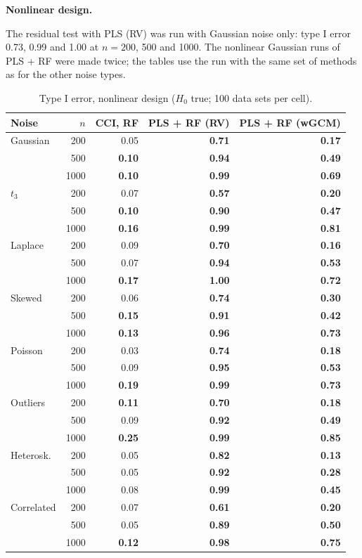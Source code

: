 \documentclass[10pt,leqno]{amsart}
\newcommand{\hi}[1]{\textbf{#1}}            %
\begin{document}
\par\medskip\noindent\textbf{Nonlinear design.}\par\nopagebreak

The residual test with PLS (RV) was run with Gaussian noise only: type I error 0.73,
0.99 and 1.00 at $n=200$, 500 and 1000. The nonlinear Gaussian runs of PLS + RF were
made twice; the tables use the run with the same set of methods as for the other noise
types.

\begin{table}[H]
\caption{Type I error, nonlinear design ($H_0$ true; 100 data sets per cell).}
\label{tab:nonlin-type1}
\footnotesize
\begin{tabular}{lrrrr}
\toprule
Noise & $n$ & CCI, RF & PLS + RF (RV) & PLS + RF (wGCM) \\
\midrule
Gaussian & 200 & 0.05 & \hi{0.71} & \hi{0.17} \\
 & 500 & \hi{0.10} & \hi{0.94} & \hi{0.49} \\
 & 1000 & \hi{0.10} & \hi{0.99} & \hi{0.69} \\
\addlinespace[1pt]
$t_3$ & 200 & 0.07 & \hi{0.57} & \hi{0.20} \\
 & 500 & \hi{0.10} & \hi{0.90} & \hi{0.47} \\
 & 1000 & \hi{0.16} & \hi{0.99} & \hi{0.81} \\
\addlinespace[1pt]
Laplace & 200 & 0.09 & \hi{0.70} & \hi{0.16} \\
 & 500 & 0.07 & \hi{0.94} & \hi{0.53} \\
 & 1000 & \hi{0.17} & \hi{1.00} & \hi{0.72} \\
\addlinespace[1pt]
Skewed & 200 & 0.06 & \hi{0.74} & \hi{0.30} \\
 & 500 & \hi{0.15} & \hi{0.91} & \hi{0.42} \\
 & 1000 & \hi{0.13} & \hi{0.96} & \hi{0.73} \\
\addlinespace[1pt]
Poisson & 200 & 0.03 & \hi{0.74} & \hi{0.18} \\
 & 500 & 0.09 & \hi{0.95} & \hi{0.53} \\
 & 1000 & \hi{0.19} & \hi{0.99} & \hi{0.73} \\
\addlinespace[1pt]
Outliers & 200 & \hi{0.11} & \hi{0.70} & \hi{0.18} \\
 & 500 & 0.09 & \hi{0.92} & \hi{0.49} \\
 & 1000 & \hi{0.25} & \hi{0.99} & \hi{0.85} \\
\addlinespace[1pt]
Heterosk. & 200 & 0.05 & \hi{0.82} & \hi{0.13} \\
 & 500 & 0.05 & \hi{0.92} & \hi{0.28} \\
 & 1000 & 0.08 & \hi{0.99} & \hi{0.45} \\
\addlinespace[1pt]
Correlated & 200 & 0.07 & \hi{0.61} & \hi{0.20} \\
 & 500 & 0.05 & \hi{0.89} & \hi{0.50} \\
 & 1000 & \hi{0.12} & \hi{0.98} & \hi{0.75} \\
\bottomrule
\end{tabular}
\end{table}
\end{document}
